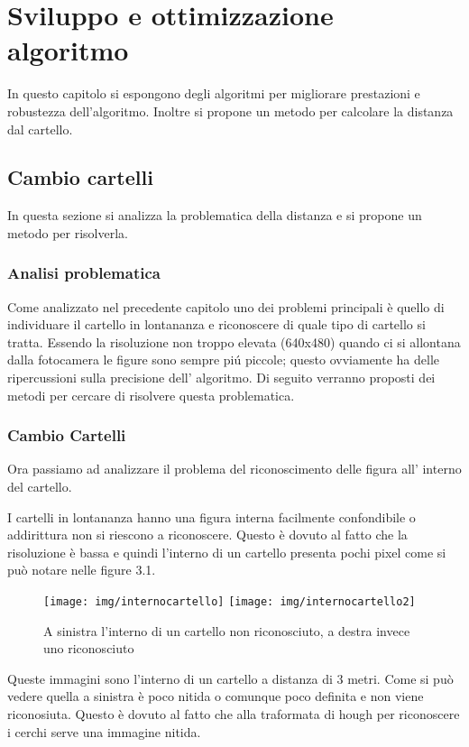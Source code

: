 \chapter{Sviluppo e ottimizzazione algoritmo}

In questo capitolo si espongono degli algoritmi per migliorare prestazioni e robustezza dell'algoritmo. Inoltre si propone un metodo per calcolare la distanza dal cartello.

\section{Cambio cartelli}

	In questa sezione si analizza la problematica della distanza e si propone un metodo per risolverla.

	\subsection{Analisi problematica}
		Come analizzato nel precedente capitolo uno dei problemi principali è quello di individuare il cartello in lontananza e riconoscere di quale tipo di cartello si tratta.
		Essendo la risoluzione non troppo elevata (640x480) quando ci si allontana dalla fotocamera le figure sono sempre pi\'u piccole; questo ovviamente ha delle ripercussioni sulla precisione dell' algoritmo.
		Di seguito verranno proposti dei metodi per cercare di risolvere questa problematica.


	\subsection{Cambio Cartelli}
		Ora passiamo ad analizzare il problema del riconoscimento delle figura all' interno del cartello.

		I cartelli in lontananza hanno una figura interna facilmente confondibile o addirittura non si riescono a riconoscere. Questo è dovuto al fatto che la risoluzione è bassa e quindi l'interno di un cartello presenta pochi pixel come si può notare nelle figure 3.1.

		\begin{figure}[!ht]
			\centering
			\texttt{[image: img/internocartello]}
			\texttt{[image: img/internocartello2]}
			\caption[Interno cartelli]{A sinistra l'interno di un cartello non riconosciuto, a destra invece uno riconosciuto}
		\end{figure}
		
		Queste immagini sono l'interno di un cartello a distanza di 3 metri. Come si può vedere quella a sinistra è poco nitida o comunque poco definita e non viene riconosiuta. Questo è dovuto al fatto che alla traformata di hough per riconoscere i cerchi serve una immagine nitida.

